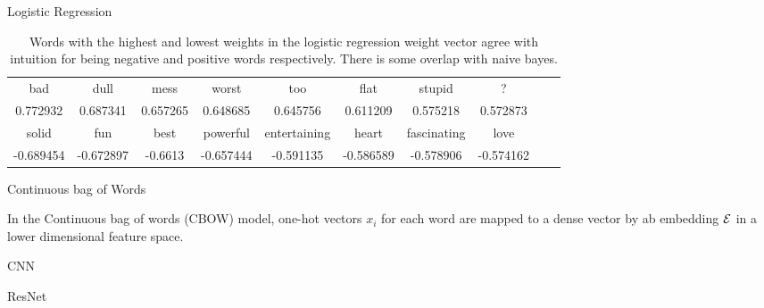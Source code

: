\documentclass[11pt]{article}
\begin{document}
\begin{subsection}{Logistic Regression}
\begin{table}[h]
\centering
\begin{tabular}{cccccccccc}
 \midrule
bad & dull & mess  & worst & too &flat & stupid&? \\
   0.772932 & 0.687341& 0.657265 &0.648685&0.645756&0.611209 & 0.575218 &  0.572873 \\
 \bottomrule
 \bottomrule
 solid  & fun& best & powerful & entertaining & heart & fascinating & love \\
  -0.689454 & -0.672897& -0.6613 & -0.657444 & -0.591135 &  -0.586589 &-0.578906 & -0.574162 \\
 \bottomrule
\end{tabular}
\caption{\label{tab:logwords} Words with the highest and lowest weights in the logistic regression weight vector agree with intuition for being negative and positive words respectively. There is some overlap with naive bayes.}
\end{table}

\end{subsection}




\begin{subsection}{Continuous bag of Words}

In the Continuous bag of words (CBOW) model, one-hot vectors $x_i$ for each word are mapped to a dense vector by ab embedding $\mathcal{E}$ in a lower dimensional feature space. 

\end{subsection}


\begin{subsection}{CNN}

\end{subsection}





\begin{subsection}{ResNet}

\end{subsection}
\end{document}
